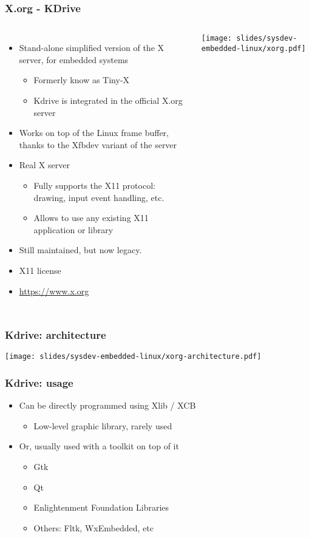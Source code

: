\begin{frame}
  \frametitle{X.org - KDrive}
  \begin{columns}[T]
    \begin{itemize}
    \item Stand-alone simplified version of the X server, for embedded
      systems
      \begin{itemize}
      \item Formerly know as Tiny-X
      \item Kdrive is integrated in the official X.org server
      \end{itemize}
    \item Works on top of the Linux frame buffer, thanks to the Xfbdev
      variant of the server
    \item Real X server
      \begin{itemize}
      \item Fully supports the X11 protocol: drawing, input event
        handling, etc.
      \item Allows to use any existing X11 application or library
      \end{itemize}
    \item Still maintained, but now legacy.
    \item X11 license
    \item \url{https://www.x.org}
    \end{itemize}
    \texttt{[image: slides/sysdev-embedded-linux/xorg.pdf]}
  \end{columns}
\end{frame}

\begin{frame}
  \frametitle{Kdrive: architecture}
  \begin{center}
    \texttt{[image: slides/sysdev-embedded-linux/xorg-architecture.pdf]}
  \end{center}
\end{frame}

\begin{frame}
  \frametitle{Kdrive: usage}
  \begin{itemize}
  \item Can be directly programmed using Xlib / XCB
    \begin{itemize}
    \item Low-level graphic library, rarely used
    \end{itemize}
  \item Or, usually used with a toolkit on top of it
    \begin{itemize}
    \item Gtk
    \item Qt
    \item Enlightenment Foundation Libraries
    \item Others: Fltk, WxEmbedded, etc
    \end{itemize}
  \end{itemize}
\end{frame}

